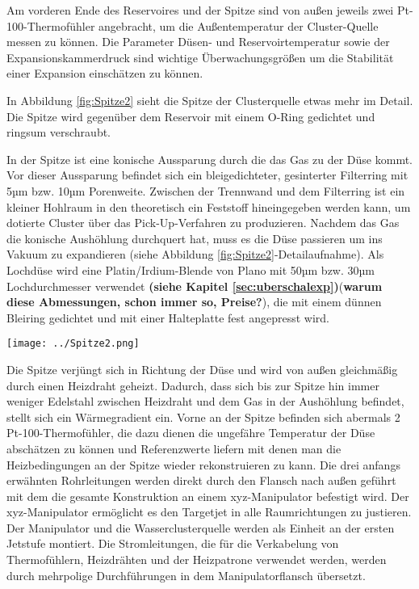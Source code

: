    Am vorderen Ende des Reservoires und der Spitze sind von außen jeweils zwei Pt-100-Thermofühler angebracht, um die Außentemperatur der Cluster-Quelle messen zu können. 
   Die Parameter Düsen- und Reservoirtemperatur sowie der Expansionskammerdruck sind wichtige Überwachungsgrößen um die Stabilität einer Expansion einschätzen zu können.
   
In Abbildung \ref{fig:Spitze2} sieht die Spitze der Clusterquelle etwas mehr im Detail.
Die Spitze wird gegenüber dem Reservoir mit einem O-Ring gedichtet und ringsum verschraubt.


 In der Spitze ist eine konische Aussparung durch die das Gas zu der Düse kommt. Vor dieser Aussparung befindet sich ein bleigedichteter, gesinterter Filterring mit 5µm bzw. 10µm Porenweite. Zwischen der Trennwand und dem Filterring ist ein kleiner Hohlraum in den theoretisch ein Feststoff hineingegeben werden kann, um dotierte Cluster  über das Pick-Up-Verfahren zu produzieren. Nachdem das Gas die konische Aushöhlung durchquert hat, muss es die Düse passieren um ins Vakuum zu expandieren (siehe Abbildung \ref{fig:Spitze2}-Detailaufnahme). Als Lochdüse wird eine Platin/Irdium-Blende von Plano mit 50µm bzw. 30µm Lochdurchmesser verwendet \textbf{(siehe Kapitel \ref{sec:uberschalexp})}(\textbf{warum diese Abmessungen, schon immer so, Preise?}), die mit einem dünnen Bleiring gedichtet und mit einer Halteplatte fest angepresst wird. %

\begin{center} 
\begin{minipage}{\linewidth}
\texttt{[image: ../Spitze2.png]}%
  \label{fig:Spitze2}
\end{minipage} 
\end{center} 

Die Spitze verjüngt sich in Richtung der Düse und wird von außen gleichmäßig durch einen Heizdraht geheizt. Dadurch, dass sich bis zur Spitze hin immer weniger Edelstahl zwischen Heizdraht und dem Gas in der Aushöhlung befindet, stellt sich ein Wärmegradient ein. Vorne an der Spitze befinden sich abermals 2 Pt-100-Thermofühler, die dazu dienen die ungefähre Temperatur der Düse abschätzen zu können und Referenzwerte liefern mit denen man die Heizbedingungen an der Spitze wieder rekonstruieren zu kann. 
%
Die drei anfangs erwähnten Rohrleitungen werden direkt durch den Flansch nach außen geführt mit dem die gesamte Konstruktion an einem xyz-Manipulator befestigt wird. Der xyz-Manipulator ermöglicht es den Targetjet in alle Raumrichtungen zu justieren. Der Manipulator und die Wasserclusterquelle werden als Einheit an der ersten Jetstufe montiert. 
Die Stromleitungen, die für die Verkabelung von Thermofühlern, Heizdrähten und der Heizpatrone verwendet werden, werden durch mehrpolige Durchführungen in dem Manipulatorflansch übersetzt. 

